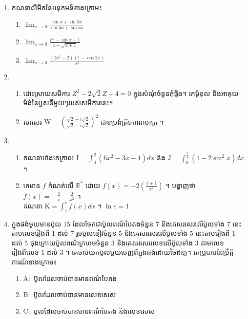 \documentclass{officialexam}
\begin{document}
	{\maketitle}
	\begin{center}
	\end{center}
	\begin{enumerate}[I]
		\item គណនាលីមីតនៃអនុគមន៍ខាងក្រោម៖
		\begin{enumerate}[k,3]
			\item $\lim_{x\to0}\frac{\sin x+\sin3x}{\sin4x+\sin5x}$
			\item $\lim_{x\to0}\frac{e^x-\sin x-1}{1-\sqrt{x+1}}$
			\item $\lim_{x\to0}\frac{(2e^x-2)(1-\cos2x)}{x^3}$
		\end{enumerate}
		\item\begin{enumerate}[k]
			\item ដោះស្រាយសមីការ $Z^2-2\sqrt{2}Z+4=0$ ក្នុងសំណុំចំនួនកុំផ្លិច។ រកម៉ូឌុល និងអាគុយម៉ង់នៃឬសនីមួយៗរបស់សមីការនេះ។
			\item សរសេរ $\mathrm{W}=\left(\frac{\sqrt{2}+i\sqrt{2}}{\sqrt{2}-i\sqrt{2}}\right)^2$ ជាទម្រង់ត្រីកោណមាត្រ ។
		\end{enumerate}
		\item \begin{enumerate}[k]
			\item គណនាអាំងតេក្រាល $\mathrm{I}=\int_0^2\left(6x^2-3x-1\right)dx$ និង $\mathrm{J}=\int_{0}^{\frac{\pi}{2}}\left(1-2\sin^2x\right)dx$ ។
			\item គេមាន $f$ កំណត់លើ $\mathbb{R^*}$ ដោយ $f(x)=-2\left(\frac{x+1}{x^2}\right)$ ។ បង្ហាញថា $f(x)=-\frac{2}{x}-\frac{2}{x^2}$ ។\\
			គណនា $\mathrm{K}=\int_{1}^{e}f(x)dx$ ។ $\ln e=1$
		\end{enumerate}
		\item ក្នុងផង់មួយមានប៊ូល $15$ ដែលចែកជាប៊ូលពណ៌បៃតងចំនួន $7$ និងគេសរសេរលើប៊ូលទាំង $7$ នេះតាមលេខរៀងពី $1$ ដល់ $7$ រួចប៊ូលខៀវចំនួន $5$ និងគេសរសេរលើប៊ូលទាំង $5$ នេះតាមរៀងពី $1$ ដល់ $5$ ចុងក្រោយប៊ូលពណ៌ក្រហមចំនួន $3$ និងគេសរសេរលេខលើប៊ូលទាំង $3$ តាមលេខរៀងពីលេខ $1$ ដល់ $3$ ។ គេចាប់យកប៊ូលមួយចេញពីក្នុងផង់ដោយចៃដន្យ។ រកប្រូបាបនៃប្រឹត្តិការណ៍ខាងក្រោម៖ 
		\begin{enumerate}[k]
			\item $\mathrm{A}:$ ប៊ូលដែលចាប់បានមានពណ៌បៃតង
			\item $\mathrm{B}:$ ប៊ូលដែលចាប់បានមានលេខសេស
			\item $\mathrm{C}:$ ប៊ូលដែលចាប់បានមានពណ៌បៃតង និងលេខសេស

\end{enumerate}
\end{enumerate}
\end{document}
